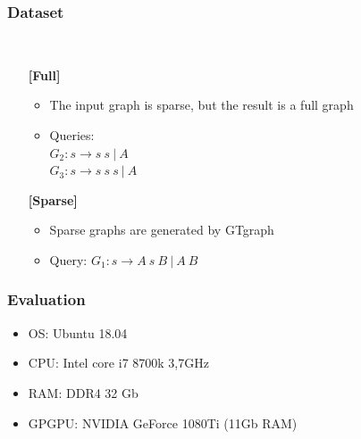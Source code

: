 \documentclass[xcolor=table]{beamer}
\begin{document}
\begin{frame}[fragile] \frametitle{Dataset}
  \begin{minipage}[t]{1cm}
\hspace{1cm}
  \end{minipage}
  ~
\begin{minipage}[t]{0.85\textwidth}
\begin{itemize}
\item[\textbf{[Full]}]
\begin{itemize}
  \item The input graph is sparse, but the result is a full graph
  \item Queries: \\ $G_2: s \to s \ s \ | \ A$ \\ $G_3: s \to s \ s \ s \ | \ A$
\end{itemize}
\pause
\item[\textbf{[Sparse]}]
\begin{itemize}
  \item Sparse graphs are generated by GTgraph
  \item Query: $G_1: s \to A \ s \ B \ | \ A \ B$
\end{itemize}
\end{itemize}
\end{minipage}
\end{frame}

\begin{frame} \frametitle{Evaluation}
  \begin{itemize}
   \item OS: Ubuntu 18.04
   \item CPU: Intel core i7 8700k 3,7GHz
   \item RAM: DDR4 32 Gb
   \item GPGPU: NVIDIA GeForce 1080Ti (11Gb RAM)
  \end{itemize}
\end{frame}
\end{document}
